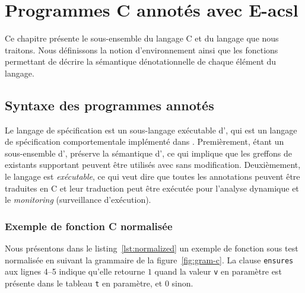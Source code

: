 
\chapter{Programmes C annotés avec E-acsl}
\label{sec:lang}

\chapterintro


Ce chapitre présente le sous-ensemble du langage C et du langage \eacsl que nous
traitons.
Nous définissons la notion d'environnement ainsi que les fonctions permettant de
décrire la sémantique dénotationnelle de chaque élément du langage.


\section{Syntaxe des programmes annotés}
\label{sec:lang-syntax}


Le langage de spécification \eacsl est un sous-langage exécutable d'\acsl, qui
est un langage de spécification comportementale implémenté dans \framac.
Premièrement, étant un sous-ensemble d'\acsl, \eacsl préserve la sémantique
d'\acsl, ce qui implique que les greffons de \framac existants supportant \acsl
peuvent être utilisés avec \eacsl sans modification.
Deuxièmement, le langage \eacsl est \textit{exécutable}, ce qui veut dire que
toutes les annotations peuvent être traduites en C et leur traduction peut être
exécutée pour l'analyse dynamique et le \textit{monitoring} (surveillance
d'exécution).


\subsection{Exemple de fonction C normalisée}
\label{sec:translation-example}




Nous présentons dans le listing~\ref{lst:normalized} un exemple de fonction sous
test normalisée en suivant la grammaire de la figure~\ref{fig:gram-c}.
La clause \lstinline'ensures' aux lignes 4--5 indique qu'elle retourne $1$ quand
la valeur \lstinline'v' en paramètre est présente dans le tableau \lstinline't'
en paramètre, et $0$ sinon.

